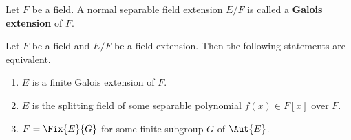 \begin{definition}
    Let $F$ be a field. A normal separable field extension $E/F$ is called a \textbf{Galois extension} of $F$.
\end{definition}

\begin{theorem}\label{thrm-equivalence-of-finite-galois-extension}
    Let $F$ be a field and $E/F$ be a field extension. Then the following statements are equivalent.
    \begin{enumerate}
        \item $E$ is a finite Galois extension of $F$.
        \item $E$ is the splitting field of some separable polynomial $f(x) \in F[x]$ over $F$.
        \item $F = \Fix{E}{G}$ for some finite subgroup $G$ of $\Aut{E}$.
    \end{enumerate}
\end{theorem}
